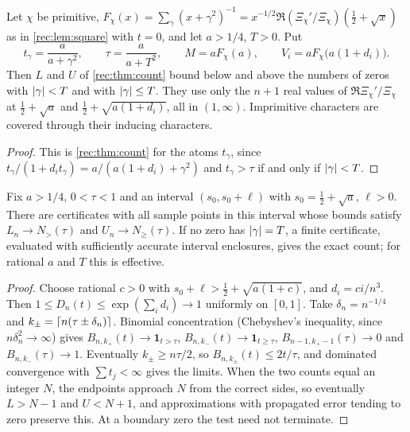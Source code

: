 \begin{corollary}\label{rec:cor:countreal}
Let $\chi$ be primitive, $F_\chi(x)=\sum_\gamma(x+\gamma^2)^{-1}=x^{-1/2}\Re(\Xi_\chi'/\Xi_\chi)(\tfrac12+\sqrt x)$
as in \cref{rec:lem:square} with $t=0$, and let $a>1/4$, $T>0$. Put
\[
 t_\gamma=\frac a{a+\gamma^2},\qquad \tau=\frac a{a+T^2},\qquad M=aF_\chi(a),\qquad
 V_i=aF_\chi\bigl(a(1+d_i)\bigr).
\]
Then $L$ and $U$ of \cref{rec:thm:count} bound below and above the numbers of zeros with
$\lvert\gamma\rvert<T$ and with $\lvert\gamma\rvert\le T$. They use only the $n+1$ real values of
$\Re\Xi_\chi'/\Xi_\chi$ at $\tfrac12+\sqrt a$ and $\tfrac12+\sqrt{a(1+d_i)}$, all in $(1,\infty)$.
Imprimitive characters are covered through their inducing characters.
\end{corollary}

\begin{proof}
This is \cref{rec:thm:count} for the atoms $t_\gamma$, since
$t_\gamma/(1+d_it_\gamma)=a/(a(1+d_i)+\gamma^2)$ and $t_\gamma>\tau$ if and only if $\lvert\gamma\rvert<T$.
\end{proof}

\begin{theorem}\label{rec:thm:countlocal}
Fix $a>1/4$, $0<\tau<1$ and an interval $(s_0,s_0+\ell)$ with $s_0=\tfrac12+\sqrt a$, $\ell>0$.
There are certificates with all sample points in this interval whose bounds satisfy
$L_n\to N_>(\tau)$ and $U_n\to N_\ge(\tau)$. If no zero has $\lvert\gamma\rvert=T$, a finite certificate,
evaluated with sufficiently accurate interval enclosures, gives the exact count; for rational
$a$ and $T$ this is effective.
\end{theorem}

\begin{proof}
Choose rational $c>0$ with $s_0+\ell>\tfrac12+\sqrt{a(1+c)}$, and $d_i=ci/n^3$. Then
$1\le D_n(t)\le\exp(\sum_id_i)\to1$ uniformly on $[0,1]$. Take $\delta_n=n^{-1/4}$ and
$k_\pm=\lceil n(\tau\pm\delta_n)\rceil$. Binomial concentration (Chebyshev's inequality, since
$n\delta_n^2\to\infty$) gives $B_{n,k_+}(t)\to\mathbf 1_{t>\tau}$, $B_{n,k_-}(t)\to\mathbf 1_{t\ge\tau}$,
$B_{n-1,k_+-1}(\tau)\to0$ and $B_{n,k_-}(\tau)\to1$. Eventually $k_\pm\ge n\tau/2$, so
$B_{n,k_\pm}(t)\le2t/\tau$, and dominated convergence with $\sum t_j<\infty$ gives the limits.
When the two counts equal an integer $N$, the endpoints approach $N$ from the correct sides,
so eventually $L>N-1$ and $U<N+1$, and approximations with propagated error tending to zero
preserve this. At a boundary zero the test need not terminate.
\end{proof}

